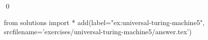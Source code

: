 
\begin{ex} 
  \label{ex:universal-turing-machine5}
  
  \qed
\end{ex} 
\begin{python0}
from solutions import *
add(label="ex:universal-turing-machine5",
    srcfilename='exercises/universal-turing-machine5/answer.tex') 
\end{python0}
